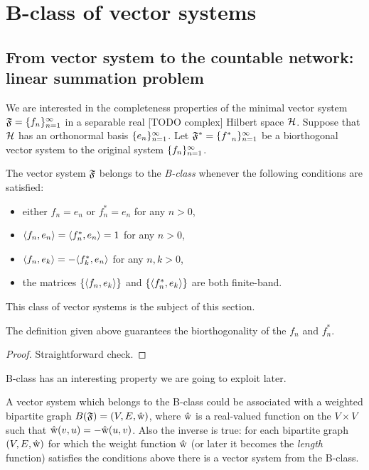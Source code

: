 \documentclass[12pt]{article}
\begin{document}


\section{B-class of vector systems}
  \subsection{From vector system to the countable network: linear summation problem}
    \label{fsys2graphs}
    We are interested in the completeness properties of the minimal vector system $\fsys = \seq{f}$
      in a separable real [TODO complex] Hilbert space $\cal{H}$.
    Suppose that $\cal{H}$ has an orthonormal basis $\seq{e}$.
    Let $\fstarsys = \seq{f^*}$ be a biorthogonal vector system to the original system $\seq{f}$.
    \begin{definition}
        The vector system $\fsys$ belongs to the \emph{B-class} whenever the following conditions are satisfied:
        \begin{itemize}
            \item either $f_n = e_n$ or $f^*_n = e_n$ for any $n > 0$,
            \item $\inner{f_n}{e_n} = \inner{f^*_n}{e_n} = 1$ for any $n > 0$,
            \item $\inner{f_n}{e_k} = -\inner{f^*_k}{e_n}$ for any $n, k > 0$,
            \item the matrices $\{\inner{f_n}{e_k}\}$ and $\{\inner{f^*_n}{e_k}\}$ are both finite-band.
        \end{itemize}
    \end{definition}
    This class of vector systems is the subject of this section.
    \begin{prop}
      The definition given above guarantees the biorthogonality of the $f_n$ and $f^*_n$.
    \end{prop}
    \begin{proof}
      Straightforward check.
    \end{proof}
    B-class has an interesting property we are going to exploit later.
    \begin{prop}
      A vector system which belongs to the B-class could be associated with a
      weighted bipartite graph $B(\fsys) = (V, E, \wt)$, where $\wt$ is a
      real-valued function on the $V\times V$ such that $\wt(v, u) = -\wt(u, v)$.
      Also the inverse is true: for each bipartite graph $(V, E, \wt)$ for which the weight function
      $\wt$ (or later it becomes the \emph{length} function) satisfies the conditions above there is a vector system from the B-class.
    \end{prop}
\end{document}
